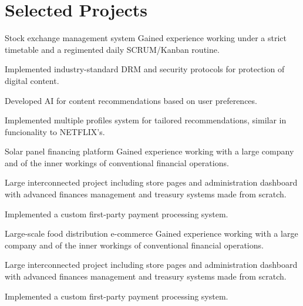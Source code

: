 \section{Selected Projects}

\begin{experience}{Stock exchange management system}{
}
Gained experience working under a strict timetable and a regimented daily SCRUM/Kanban routine.

\begin{contribs}
	\item{Implemented industry-standard DRM and security protocols for protection of digital content.}
	\item{Developed AI for content recommendations based on user preferences.}
	\item{Implemented multiple profiles system for tailored recommendations, similar in funcionality to NETFLIX's.}
\end{contribs}
\end{experience}

\begin{experience}{Solar panel financing platform}{
}
Gained experience working with a large company and of the inner workings of conventional financial operations.

\begin{contribs}
	\item{Large interconnected project including store pages and administration dashboard with advanced finances management and treasury systems made from scratch.}
	\item{Implemented a custom first-party payment processing system.}
\end{contribs}
\end{experience}

\begin{experience}{Large-scale food distribution e-commerce}{
}
Gained experience working with a large company and of the inner workings of conventional financial operations.

\begin{contribs}
	\item{Large interconnected project including store pages and administration dashboard with advanced finances management and treasury systems made from scratch.}
	\item{Implemented a custom first-party payment processing system.}
\end{contribs}
\end{experience}
